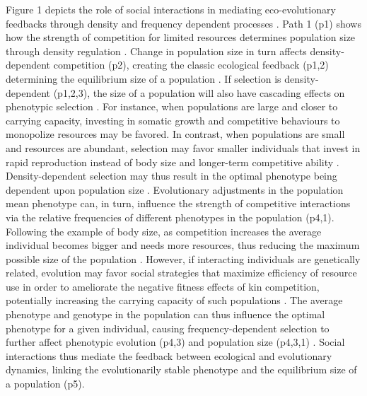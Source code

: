\documentclass{article}
\begin{document}
 Figure 1 depicts the role of social interactions in mediating eco-evolutionary feedbacks through density and frequency dependent processes \citep{Engen2020}. Path 1 (p1) shows how the strength of competition for limited resources determines population size through density regulation \citep{Gilpin1973a}. Change in population size in turn affects density-dependent competition (p2), creating the classic ecological feedback (p1,2) determining the equilibrium size of a population \citep{Travis2013}. If selection is density-dependent (p1,2,3), the size of a population will also have cascading effects on phenotypic selection  \citep{Mueller1997, Boyce1984}. For instance, when populations are large and closer to carrying capacity, investing in somatic growth and competitive behaviours to monopolize resources may be favored. In contrast, when populations are small and resources are abundant, selection may favor smaller individuals that invest in rapid reproduction instead of body size and longer-term competitive ability \citep{Joshi2001, Wright2018, Engen2017}. Density-dependent selection may thus result in the optimal phenotype being dependent upon population size \citep{Anderson1971, Charlesworth1971}. Evolutionary adjustments in the population mean phenotype can, in turn, influence the strength of competitive interactions via the relative frequencies of different phenotypes in the population \citep{Wright1969} (p4,1). Following the example of body size, as competition increases the average individual becomes bigger and needs more resources, thus reducing the maximum possible size of the population \citep{Engen2020}. However, if interacting individuals are genetically related, evolution may favor social strategies that maximize efficiency of resource use in order to ameliorate the negative fitness effects of kin competition, potentially increasing the carrying capacity of such populations \citep{Boyce1984, macarthur1967theory}. The average phenotype and genotype in the population can thus influence the optimal phenotype for a given individual, causing frequency-dependent selection to further affect phenotypic evolution (p4,3) \citep{Heino1998} and population size (p4,3,1) \citep{Svensson2018}. Social interactions thus mediate the feedback between ecological and evolutionary dynamics, linking the evolutionarily stable phenotype and the equilibrium size of a population (p5).
\end{document}
